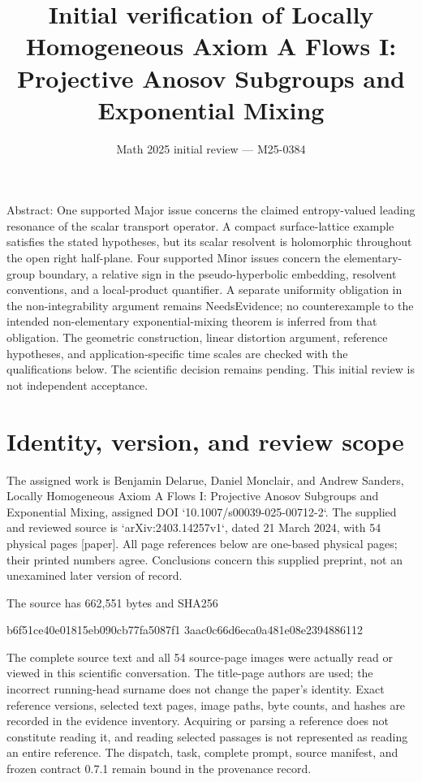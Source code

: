 \documentclass[10pt]{article}
\title{Initial verification of
Locally Homogeneous Axiom A Flows I:
Projective Anosov Subgroups and Exponential Mixing}
\author{}
\date{Math 2025 initial review — M25-0384}
\begin{document}
\maketitle
Abstract: One supported Major issue concerns the claimed entropy-valued leading resonance of the scalar transport operator. A compact surface-lattice example satisfies the stated hypotheses, but its scalar resolvent is holomorphic throughout the open right half-plane. Four supported Minor issues concern the elementary-group boundary, a relative sign in the pseudo-hyperbolic embedding, resolvent conventions, and a local-product quantifier. A separate uniformity obligation in the non-integrability argument remains NeedsEvidence; no counterexample to the intended non-elementary exponential-mixing theorem is inferred from that obligation. The geometric construction, linear distortion argument, reference hypotheses, and application-specific time scales are checked with the qualifications below. The scientific decision remains pending. This initial review is not independent acceptance.\par
\section*{Identity, version, and review scope}
The assigned work is Benjamin Delarue, Daniel Monclair, and Andrew Sanders, Locally Homogeneous Axiom A Flows I: Projective Anosov Subgroups and Exponential Mixing, assigned DOI `10.1007/s00039-025-00712-2`. The supplied and reviewed source is `arXiv:2403.14257v1`, dated 21 March 2024, with 54 physical pages [paper]. All page references below are one-based physical pages; their printed numbers agree. Conclusions concern this supplied preprint, not an unexamined later version of record.\par
The source has 662,551 bytes and SHA256\par
b6f51ce40e01815eb090cb77fa5087f1
3aac0c66d6eca0a481e08e2394886112\par
The complete source text and all 54 source-page images were actually read or viewed in this scientific conversation. The title-page authors are used; the incorrect running-head surname does not change the paper’s identity. Exact reference versions, selected text pages, image paths, byte counts, and hashes are recorded in the evidence inventory. Acquiring or parsing a reference does not constitute reading it, and reading selected passages is not represented as reading an entire reference. The dispatch, task, complete prompt, source manifest, and frozen contract 0.7.1 remain bound in the provenance record.\par
\end{document}
